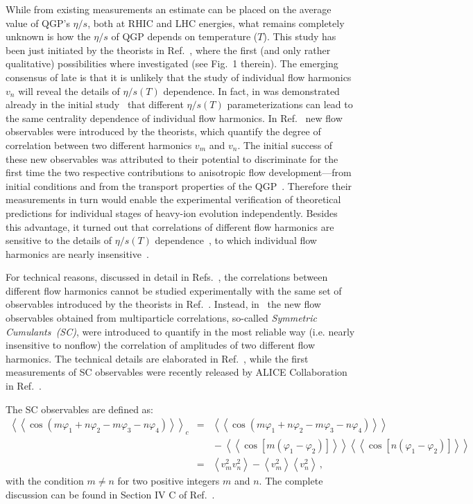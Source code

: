 While from existing measurements an estimate can be placed on the average value of QGP's $\eta/s$, both at RHIC and LHC energies, what remains completely unknown is how the $\eta/s$ of QGP depends on temperature ($T$). This study has been just initiated by the theorists in Ref.~\cite{Niemi:2015qia}, where the first (and only rather qualitative) possibilities where investigated (see Fig.~1 therein). The emerging consensus of late is that it is unlikely that the study of individual flow harmonics $v_n$ will reveal the details of $\eta/s(T)$ dependence. In fact, in was demonstrated already in the initial study~\cite{Niemi:2015qia} that different $\eta/s(T)$ parameterizations can lead to the same centrality dependence of individual flow harmonics. In Ref.~\cite{Niemi:2012aj} new flow observables were introduced by the theorists, which quantify the degree of correlation between two different harmonics $v_m$ and $v_n$. The initial success of these new observables was attributed to their potential to discriminate for the first time the two respective contributions to anisotropic flow development---from initial conditions and from the transport properties of the QGP~\cite{Niemi:2012aj}. Therefore their measurements in turn would enable the experimental verification of theoretical predictions for individual stages of heavy-ion evolution independently. Besides this advantage, it turned out that correlations of different flow harmonics are sensitive to the details of $\eta/s(T)$ dependence~\cite{ALICE:2016kpq}, to which individual flow harmonics are nearly insensitive~\cite{Niemi:2015qia}. 
 
For technical reasons, discussed in detail in Refs.~\cite{ALICE:2016kpq,Bilandzic:2013kga}, the correlations between different flow harmonics cannot be studied experimentally with the same set of observables introduced by the theorists in Ref.~\cite{Niemi:2012aj}. 
Instead, in~\cite{Bilandzic:2013kga} the new flow observables obtained from multiparticle correlations, so-called \textit{Symmetric Cumulants~(SC)}, were introduced to quantify in the most reliable way (i.e. nearly insensitive to nonflow) the correlation of amplitudes of two different flow harmonics.
The technical details are elaborated in Ref.~\cite{Bilandzic:2013kga}, while the first measurements of SC observables were recently released by ALICE Collaboration in Ref.~\cite{ALICE:2016kpq}.

The SC observables are defined as:
\begin{eqnarray}
\left<\left<\cos(m\varphi_1\!+\!n\varphi_2\!-\!m\varphi_3-\!n\varphi_4)\right>\right>_c &=& \left<\left<\cos(m\varphi_1\!+\!n\varphi_2\!-\!m\varphi_3-\!n\varphi_4)\right>\right>\nonumber\\
&&{}-\left<\left<\cos[m(\varphi_1\!-\!\varphi_2)]\right>\right>\left<\left<\cos[n(\varphi_1\!-\!\varphi_2)]\right>\right>\nonumber\\
&=&\left<v_{m}^2v_{n}^2\right>-\left<v_{m}^2\right>\left<v_{n}^2\right>\,,%
\label{eq:4p_cumulant}
\end{eqnarray}
%
with the condition $m\neq n$ for two positive integers $m$ and $n$. The complete discussion can be found in Section IV C of Ref.~\cite{Bilandzic:2013kga}.

